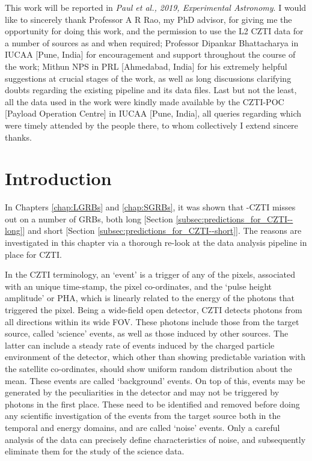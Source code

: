 \begin{checkit}
This work will be reported in \emph{Paul et al., 2019, Experimental Astronomy}. I would like to sincerely thank Professor A R Rao, my PhD advisor, for giving me the opportunity for doing this work, and the permission to use the L2 CZTI data for a number of sources as and when required; Professor Dipankar Bhattacharya in IUCAA [Pune, India] for encouragement and support throughout the course of the work; Mithun NPS in PRL [Ahmedabad, India] for his extremely helpful suggestions at crucial stages of the work, as well as long discussions clarifying doubts regarding the existing pipeline and its data files. Last but not the least, all the data used in the work were kindly made available by the CZTI-POC [Payload Operation Centre] in IUCAA [Pune, India], all queries regarding which were timely attended by the people there, to whom collectively I extend sincere thanks.
\end{checkit}



\section{Introduction}
\label{sec:introduction--noise}
In Chapters \ref{chap:LGRBs} and \ref{chap:SGRBs}, it was shown that \AS -CZTI misses out on a number of GRBs, both long [Section \ref{subsec:predictions_for_CZTI--long}] and short [Section \ref{subsec:predictions_for_CZTI--short}]. The reasons are investigated in this chapter via a thorough re-look at the data analysis pipeline in place for CZTI.

In the CZTI terminology, an `event' is a trigger of any of the pixels, associated with an unique time-stamp, the pixel co-ordinates, and the `pulse height amplitude' or PHA, which is linearly related to the energy of the photons that triggered the pixel. Being a wide-field open detector, CZTI detects photons from all directions within its wide FOV. These photons include those from the target source, called `science' events, as well as those induced by other sources. The latter can include a steady rate of events induced by the charged particle environment of the detector, which other than showing predictable variation with the satellite co-ordinates, should show uniform random distribution about the mean. These events are called `background' events. On top  of this, events may be generated by the peculiarities in the detector and may not be triggered by photons in the first place. These need to be identified and removed before doing any scientific investigation of the events from the target source both in the temporal and energy domains, and are called `noise' events. Only a careful analysis of the data can precisely define characteristics of noise, and subsequently eliminate them for the study of the science data.

